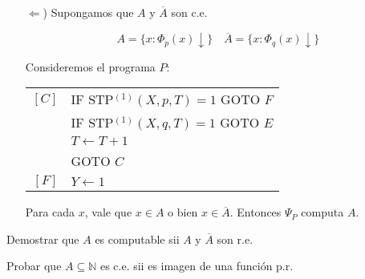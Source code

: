 \begin{questions}
\begin{solution}
\begin{itemize}
 \item[$\Leftarrow$)] Supongamos que $A$ y $\overline{A}$ son c.e.
 
 \begin{equation*}
  A = \{x : \Phi_p(x)\downarrow \} \quad \overline{A} = \{x : \Phi_q(x)\downarrow \}
 \end{equation*}
 
 Consideremos el programa $P$: 
 
  \vspace{0.5cm}
  \begin{tabular}{rl}
    $[C]$ & IF STP$^{(1)}(X,p,T) = 1$ GOTO $F$ \\
	  & IF STP$^{(1)}(X,q,T) = 1$ GOTO $E$ \\
	  & $T\leftarrow T+1$ \\
	  & GOTO $C$ \\
    $[F]$ & $Y\leftarrow 1$ \\
  \end{tabular}
  \vspace{0.5cm}

  Para cada $x$, vale que $x\in A$ o bien $x\in\overline{A}$. Entonces $\Psi_P$ computa $A$. 
\end{itemize}

\end{solution}

\question Demostrar que $A$ es computable sii $A$ y $\overline{A}$ son r.e.


\question Probar que $A \subseteq \mathbb{N}$ es c.e. sii es imagen de una funci\'on p.r.


\end{questions}